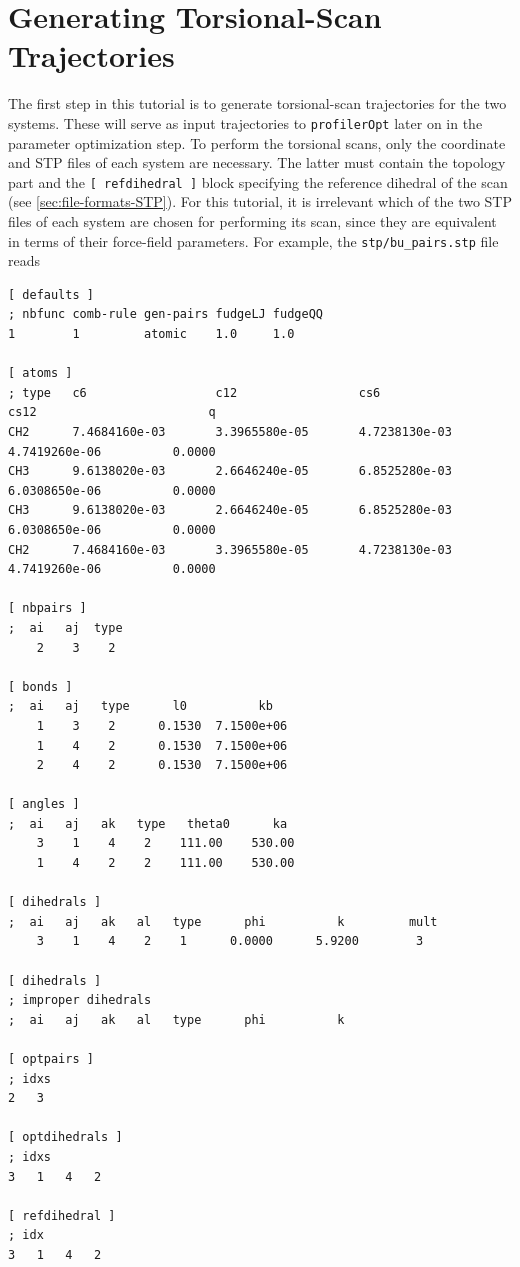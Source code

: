 \documentclass[10pt,a4paper,openany]{memoir}
\numberwithin{equation}{section}
\newcommand{\under}{\_}
\newcommand{\profileropt}[0]{\texttt{profilerOpt}}
\begin{document}
\section{Generating Torsional-Scan Trajectories}
\label{sec:tutorial-profilergen}

The first step in this tutorial is to generate torsional-scan
trajectories for the two systems.
%
These will serve as input trajectories to \profileropt{} later on in
the parameter optimization step.
%
To perform the torsional scans, only the coordinate and
STP files of each system are necessary.
%
The latter must contain the topology part and the
\texttt{[~refdihedral~]} block specifying the reference dihedral of
the scan (see \autoref{sec:file-formats-STP}).
%
For this tutorial, it is irrelevant which of the two STP files of each
system are chosen for performing its scan, since they are equivalent
in terms of their force-field parameters.
%
%
For example, the \texttt{stp/bu\under{}pairs.stp} file reads

\begin{lstlisting}[language=gromacs]
[ defaults ]
; nbfunc comb-rule gen-pairs fudgeLJ fudgeQQ
1        1         atomic    1.0     1.0

[ atoms ]
; type   c6                  c12                 cs6                 cs12                        q
CH2      7.4684160e-03       3.3965580e-05       4.7238130e-03       4.7419260e-06          0.0000
CH3      9.6138020e-03       2.6646240e-05       6.8525280e-03       6.0308650e-06          0.0000
CH3      9.6138020e-03       2.6646240e-05       6.8525280e-03       6.0308650e-06          0.0000
CH2      7.4684160e-03       3.3965580e-05       4.7238130e-03       4.7419260e-06          0.0000

[ nbpairs ]
;  ai   aj  type
    2    3    2     

[ bonds ]
;  ai   aj   type      l0          kb
    1    3    2      0.1530  7.1500e+06 
    1    4    2      0.1530  7.1500e+06 
    2    4    2      0.1530  7.1500e+06 

[ angles ]
;  ai   aj   ak   type   theta0      ka
    3    1    4    2    111.00    530.00 
    1    4    2    2    111.00    530.00 

[ dihedrals ]
;  ai   aj   ak   al   type      phi          k         mult
    3    1    4    2    1      0.0000      5.9200        3 

[ dihedrals ]
; improper dihedrals
;  ai   aj   ak   al   type      phi          k         

[ optpairs ]
; idxs
2   3   

[ optdihedrals ]
; idxs
3   1   4   2   

[ refdihedral ]
; idx
3   1   4   2
\end{lstlisting}\vspace{2ex}\par
\end{document}
